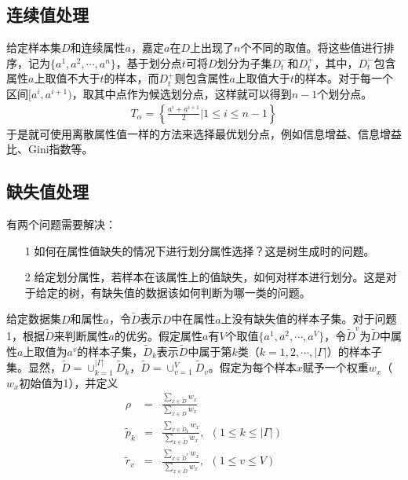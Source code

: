 \subsection{连续值处理}
给定样本集$D$和连续属性$a$，嘉定$a$在$D$上出现了$n$个不同的取值。将这些值进行排序，记为$\{ a^1,a^2,\cdots,a^n \}$，基于划分点$t$可将$D$划分为子集$D_t^-$和$D_t^+$，其中，$D_t^-$包含属性$a$上取值不大于$t$的样本，而$D_t^+$则包含属性$a$上取值大于$t$的样本。对于每一个区间$[ a^i,a^{i+1} )$，取其中点作为候选划分点，这样就可以得到$n-1$个划分点。
\begin{eqnarray}
T_\alpha=
\left\lbrace
\frac{a^i+a^{i+1}}{2}|1\leq i\leq n-1
\right\rbrace
\end{eqnarray}
于是就可使用离散属性值一样的方法来选择最优划分点，例如信息增益、信息增益比、Gini指数等。

\subsection{缺失值处理}
有两个问题需要解决：
\begin{itemize}
\item[1] 如何在属性值缺失的情况下进行划分属性选择？这是树生成时的问题。
\item[2] 给定划分属性，若样本在该属性上的值缺失，如何对样本进行划分。这是对于给定的树，有缺失值的数据该如何判断为哪一类的问题。
\end{itemize}
给定数据集$D$和属性$a$，令$\tilde{D}$表示$D$中在属性$a$上没有缺失值的样本子集。对于问题1，根据$\tilde{D}$来判断属性$a$的优劣。假定属性$a$有$V$个取值$\{ a^1,a^2,\cdots,a^V \}$，令$\tilde{D}^v$为$\tilde{D}$中属性$a$上取值为$a^v$的样本子集，$\tilde{D}_k$表示$\tilde{D}$中属于第$k$类（$k=1,2,\cdots,|\Gamma|$）的样本子集。显然，$\tilde{D}=\cup^{|\Gamma|}_{k=1}\tilde{D}_k$，$\tilde{D}=\cup^{V}_{v=1}\tilde{D}_v$。假定为每个样本$x$赋予一个权重$w_x$（$w_x$初始值为1），并定义
\begin{eqnarray}
\rho&=&\frac{\sum_{x\in \tilde{D}}w_x}{\sum_{x\in D}w_x}\\
\tilde{p}_k&=&\frac{\sum_{x\in \tilde{D}_k}w_x}{\sum_{x\in \tilde{D}}w_x},\ \ (1\leq k \leq |\Gamma|) \\
\tilde{r}_v&=&\frac{\sum_{x\in \tilde{D}^v}w_x}{\sum_{x\in \tilde{D}}w_x},\ \ (1\leq v \leq V)
\end{eqnarray}